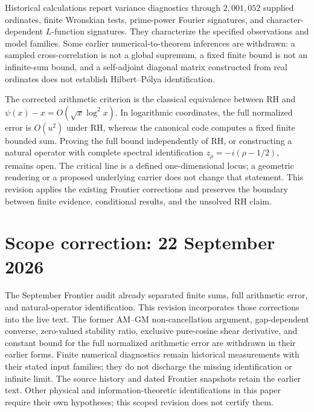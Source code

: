 \documentclass[11pt,a4paper]{article}
\theoremstyle{plain}
\theoremstyle{definition}
\theoremstyle{remark}
\begin{document}
\begin{titlepage}
\begin{center}
\begin{minipage}{0.88\textwidth}
Historical calculations report variance diagnostics through $2{,}001{,}052$
supplied ordinates, finite Wronskian tests, prime-power Fourier signatures,
and character-dependent $L$-function signatures. They characterize the
specified observations and model families. Some earlier numerical-to-theorem
inferences are withdrawn: a sampled cross-correlation is not a global
supremum, a fixed finite bound is not an infinite-sum bound, and a
self-adjoint diagonal matrix constructed from real ordinates does not
establish Hilbert--P\'olya identification.

The corrected arithmetic criterion is the classical equivalence between
RH and $\psi(x)-x=O(\sqrt{x}\log^2x)$. In logarithmic coordinates, the
full normalized error is $O(u^2)$ under RH, whereas the canonical code
computes a fixed finite bounded sum. Proving the full bound independently
of RH, or constructing a natural operator with complete spectral
identification $z_\rho=-i(\rho-1/2)$, remains open. The critical line is a
defined one-dimensional locus; a geometric rendering or a proposed
underlying carrier does not change that statement. This revision applies
the existing Frontier corrections and preserves the boundary between
finite evidence, conditional results, and the unsolved RH claim.

\end{minipage}
\end{center}

\vfill

\noindent{\color{acsrule}\rule{\textwidth}{0.4pt}}
\end{titlepage}

\clearpage
\hypersetup{pageanchor=true}
\setcounter{page}{1}
\tableofcontents
\clearpage
{}
\setcounter{page}{1}

\section*{Scope correction: 22 September 2026}
The September Frontier audit already separated finite sums, full arithmetic
error, and natural-operator identification. This revision incorporates those
corrections into the live text. The former AM--GM non-cancellation argument,
gap-dependent converse, zero-valued stability ratio, exclusive pure-cosine
shear derivative, and constant bound for
the full normalized arithmetic error are withdrawn in their earlier forms.
Finite numerical diagnostics remain historical measurements with their stated
input families; they do not discharge the missing identification or infinite
limit. The source history and dated Frontier snapshots retain the earlier text.
Other physical and information-theoretic identifications in this paper require
their own hypotheses; this scoped revision does not certify them.
\end{document}

